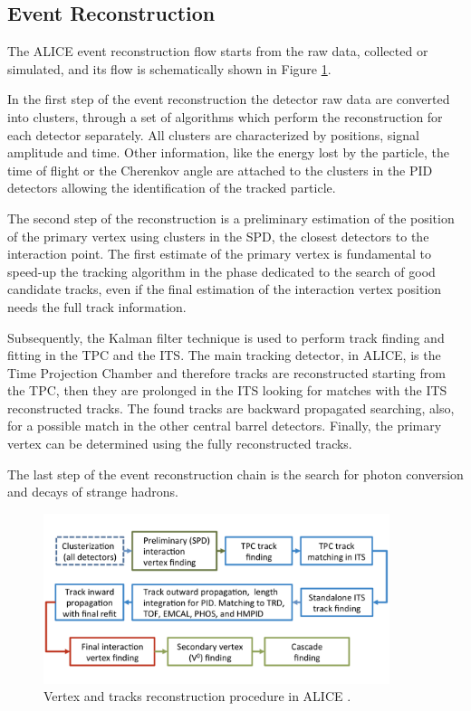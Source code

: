 %
\subsection{Event Reconstruction} \label{sec:event_rec}

The ALICE event reconstruction flow starts from the raw data, collected or simulated, and its flow is 
schematically shown in Figure \ref{fig:rec_flow}. 

In the first step of the event reconstruction the detector raw data are converted into clusters, 
through a set of algorithms which perform the reconstruction for each detector separately.
All clusters are characterized by positions, signal amplitude and time.
Other information, like the energy lost by the particle, the time of flight or the Cherenkov 
angle are attached to the clusters in the PID detectors allowing the identification of the 
tracked particle.

The second step of the reconstruction is a preliminary estimation of the position of the primary
vertex using clusters in the SPD, the closest detectors to the interaction point.
The first estimate of the primary vertex is fundamental to speed-up the tracking algorithm in the 
phase dedicated to the search of good candidate tracks, even if the final estimation of the 
interaction vertex position needs the full track information.

Subsequently, the Kalman filter technique \cite{kalman} is used to perform track finding and
fitting in the TPC and the ITS. 
The main tracking detector, in ALICE, is the Time Projection Chamber and therefore tracks are reconstructed 
starting from the TPC, then they are prolonged in the ITS looking for matches with the ITS 
reconstructed tracks. 
The found tracks are backward propagated searching, also, for a possible match in the other central
barrel detectors.
Finally, the primary vertex can be determined using the fully reconstructed tracks.

The last step of the event reconstruction chain is the search for photon conversion and decays of
strange hadrons.

\begin{figure}
    \captionsetup{justification=centering}
    \centering
    \includegraphics[width=0.9\textwidth]{gfx/reconstruction}
	\caption{Vertex and tracks reconstruction procedure in ALICE \cite{alice:Perf2014}.}
	\label{fig:rec_flow}
\end{figure}

